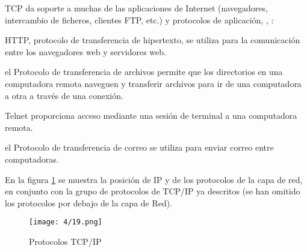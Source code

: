 TCP da soporte a muchas de las aplicaciones de Internet (navegadores, intercambio de ficheros, clientes FTP, etc.) y protocolos de aplicación, ,  :
\begin{description} 
	\item[HTTP]   \gls{HTTP},  protocolo de transferencia de hipertexto,   se utiliza para la comunicación entre los navegadores web y servidores web.
	
	\item[FTP]  el Protocolo de transferencia de archivos permite que los directorios en una computadora remota naveguen y transferir archivos para ir de una computadora a otra a través de una conexión.
	
	\item[Telnet]  Telnet proporciona acceso mediante una sesión de terminal a una computadora remota.
	
	\item [SMTP] el Protocolo  de transferencia de correo se utiliza para enviar correo entre computadoras.
\end{description}

En la figura \ref{fig:TCP-suite}  se muestra la posición de IP y de los protocolos de la capa de red, en conjunto con la grupo de protocolos  de TCP/IP ya descritos (se han omitido los protocolos por debajo de la capa de Red).


\begin{figure}
    \texttt{[image: 4/19.png]}
    \caption{Protocolos TCP/IP}
    \label{fig:TCP-suite}
\end{figure}

